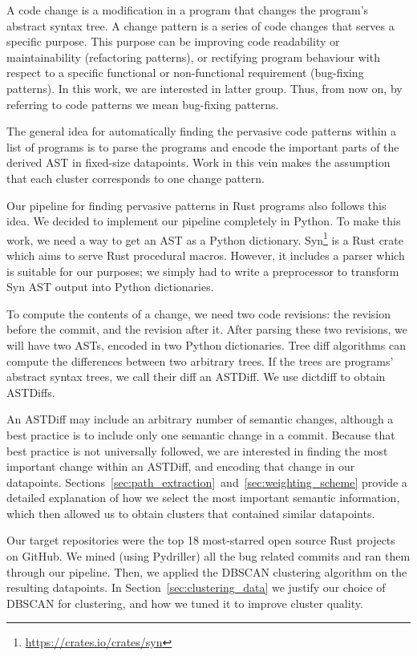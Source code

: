 A code change is a modification in a program that changes the program's abstract syntax tree. A change pattern is a series of code changes that serves a specific purpose. This purpose can be improving code readability or maintainability (refactoring patterns), or rectifying program behaviour with respect to a specific functional or non-functional requirement (bug-fixing patterns). In this work, we are interested in latter group. Thus, from now on, by referring to code patterns we mean bug-fixing patterns.

The general idea for automatically finding the pervasive code patterns within a list of programs is to parse the programs and encode the important parts of the derived AST in fixed-size datapoints. Work in this vein makes the assumption that each cluster corresponds to one change pattern.

Our pipeline for finding pervasive patterns in Rust programs also follows this idea. We decided to implement our pipeline completely in Python. To make this work, we need a way to get an AST as a Python dictionary. Syn\footnote{\url{https://crates.io/crates/syn}} is a Rust crate which aims to serve Rust procedural macros. However, it includes a parser which is suitable for our purposes; we simply had to write a preprocessor to transform Syn AST output into Python dictionaries.

To compute the contents of a change, we need two code revisions: the revision before the commit, and the revision after it. After parsing these two revisions, we will have two ASTs, encoded in two Python dictionaries. Tree diff algorithms can compute the differences between two arbitrary trees. If the trees are programs' abstract syntax trees, we call their diff an ASTDiff. We use dictdiff to obtain ASTDiffs.

An ASTDiff may include an arbitrary number of semantic changes, although a best practice is to include only one semantic change in a commit. Because that best practice is not universally followed, we are interested in finding the most important change within an ASTDiff, and encoding that change in our datapoints. Sections~\ref{sec:path_extraction}~and~\ref{sec:weighting_scheme} provide a detailed explanation of how we select the most important semantic information, which then allowed us to obtain clusters that contained similar datapoints. 

Our target repositories were the top 18 most-starred open source Rust projects on GitHub. We mined (using Pydriller) all the bug related commits and ran them through our pipeline. Then, we applied the DBSCAN clustering algorithm on the resulting datapoints. In Section~\ref{sec:clustering_data} we justify our choice of DBSCAN for clustering, and how we tuned it to improve cluster quality. 

